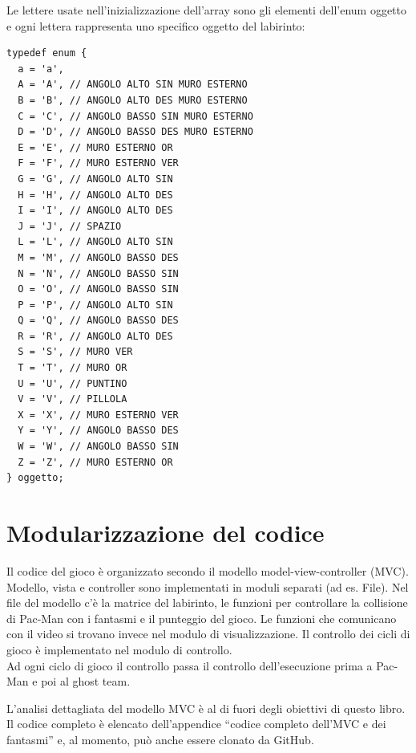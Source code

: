 \documentclass[8pt]{book}
\begin{document}
Le lettere usate nell'inizializzazione dell'array sono gli elementi dell'enum oggetto e ogni lettera rappresenta uno specifico oggetto del labirinto:\\


  \begin{spacing}{0.9}
    \begin{small}
      \begin{tcolorbox}
\begin{verbatim} 
typedef enum {
  a = 'a',
  A = 'A', // ANGOLO ALTO SIN MURO ESTERNO
  B = 'B', // ANGOLO ALTO DES MURO ESTERNO
  C = 'C', // ANGOLO BASSO SIN MURO ESTERNO
  D = 'D', // ANGOLO BASSO DES MURO ESTERNO
  E = 'E', // MURO ESTERNO OR
  F = 'F', // MURO ESTERNO VER
  G = 'G', // ANGOLO ALTO SIN
  H = 'H', // ANGOLO ALTO DES
  I = 'I', // ANGOLO ALTO DES
  J = 'J', // SPAZIO
  L = 'L', // ANGOLO ALTO SIN
  M = 'M', // ANGOLO BASSO DES
  N = 'N', // ANGOLO BASSO SIN
  O = 'O', // ANGOLO BASSO SIN
  P = 'P', // ANGOLO ALTO SIN
  Q = 'Q', // ANGOLO BASSO DES
  R = 'R', // ANGOLO ALTO DES
  S = 'S', // MURO VER
  T = 'T', // MURO OR
  U = 'U', // PUNTINO
  V = 'V', // PILLOLA
  X = 'X', // MURO ESTERNO VER
  Y = 'Y', // ANGOLO BASSO DES
  W = 'W', // ANGOLO BASSO SIN
  Z = 'Z', // MURO ESTERNO OR
} oggetto;
\end{verbatim}
\end{tcolorbox}
    \end{small}
  \end{spacing} 


\section{Modularizzazione del codice}

Il codice del gioco è organizzato secondo il modello model-view-controller (MVC). Modello, vista e controller sono implementati in moduli separati (ad es. File). Nel file del modello c'è la matrice del labirinto, le funzioni per controllare la collisione di Pac-Man con i fantasmi e il punteggio del gioco. Le funzioni che comunicano con il video si trovano invece nel modulo di visualizzazione. Il controllo dei cicli di gioco è implementato nel modulo di controllo.\\
Ad ogni ciclo di gioco il controllo passa il controllo dell'esecuzione prima a Pac-Man e poi al ghost team.

L'analisi dettagliata del modello MVC è al di fuori degli obiettivi di questo libro. Il codice completo è elencato dell'appendice ``codice completo dell'MVC e dei fantasmi'' e, al momento, può anche essere clonato da GitHub.
\end{document}
